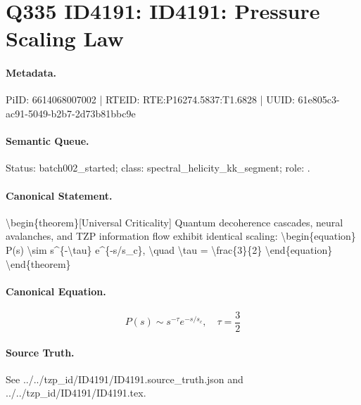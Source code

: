 \section*{Q335 ID4191: ID4191: Pressure Scaling Law}
\paragraph{Metadata.}
PiID: 6614068007002 | RTEID: RTE:P16274.5837:T1.6828 | UUID: 61e805c3-ac91-5049-b2b7-2d73b81bbc9e

\paragraph{Semantic Queue.}
Status: batch002\_started; class: spectral\_helicity\_kk\_segment; role: .

\paragraph{Canonical Statement.}
\textbackslash{}begin\{theorem\}[Universal Criticality] Quantum decoherence cascades, neural avalanches, and TZP information flow exhibit identical scaling: \textbackslash{}begin\{equation\} P(s) \textbackslash{}sim s\textasciicircum{}\{-\textbackslash{}tau\} e\textasciicircum{}\{-s/s\_c\}, \textbackslash{}quad \textbackslash{}tau = \textbackslash{}frac\{3\}\{2\} \textbackslash{}end\{equation\} \textbackslash{}end\{theorem\}

\paragraph{Canonical Equation.}
\[
\begin{equation} P(s) \sim s^{-\tau} e^{-s/s_c}, \quad \tau = \frac{3}{2} \end{equation}
\]

\paragraph{Source Truth.}
See ../../tzp\_id/ID4191/ID4191.source\_truth.json and ../../tzp\_id/ID4191/ID4191.tex.

